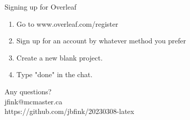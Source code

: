 \documentclass{beamer}
\begin{document}
\begin{frame}{Signing up for Overleaf}
	\begin{enumerate}
		\item Go to www.overleaf.com/register
		\item Sign up for an account by whatever method you prefer
		\item Create a new blank project.
		\item Type "done" in the chat.
	\end{enumerate}
\end{frame}


\begin{frame}
	Any questions?\\ 
	jfink@mcmaster.ca\\
	https://github.com/jbfink/20230308-latex
	
\end{frame}
\end{document}
